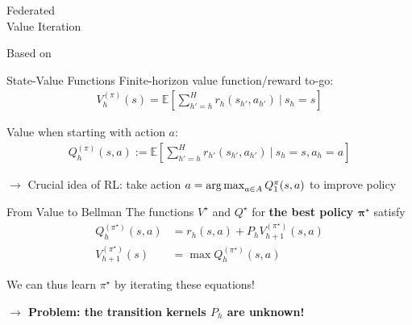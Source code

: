 \documentclass[aspectratio=169,12pt]{beamer}
\begin{document}


\begin{frame}
  \begin{center}
    \textcolor{beamer@blendedblue}{
      \huge Federated \\[1em]
      \huge Value Iteration
    }
  \end{center}

  \vspace{2em}

  Based on 

\end{frame}

\begin{frame}{State-Value Functions}
  Finite-horizon value function/reward to-go:
  \begin{align*}
    \nonumber 
    V_h^{(\pi)}(s) = \mathbb{E}\left[ {\sum_{h'=h}^{H}r_h(s_{h'},a_{h'})} ~\bigg|~ {s_{h}=s}\right]
  \end{align*}

  Value when starting with action $a$:
  \begin{align*}
    Q_h^{(\pi)}(s,a) := \mathbb{E}\left[ {\sum_{h'=h}^{H} {r_{h'}}(s_{h'},a_{h'})} ~\bigg|~ {s_{h}=s, a_{h}=a}
    \right]
  \end{align*}

  \pause

  $\rightarrow$ Crucial idea of RL: take action $a = \operatorname*{arg\,max}_{a \in A} Q_1^{\pi}(s, a)$ to improve policy


\end{frame}

\begin{frame}{From Value to Bellman}
  The functions $V^\star$ and $Q^\star$ for \textcolor{beamer@blendedblue}{\bfseries the best policy $\mathbf{\pi^\star}$} satisfy
  \begin{align*}
    Q_h^{(\pi^\star)}(s,a) & =  r_h(s,a) + P_h V_{h+1}^{(\pi^\star)} (s,a) \\ 
    V_{h+1}^{(\pi^\star)} (s) &= \max Q_h^{(\pi^\star)} (s,  a)
  \end{align*}

  \vspace{1em}

  We can thus learn $\pi^\star$ by iterating these equations!

  \textcolor{beamer@blendedblue}{\bfseries
    $\rightarrow$ Problem: the transition kernels $P_h$ are unknown!
    }
\end{frame}
\end{document}
